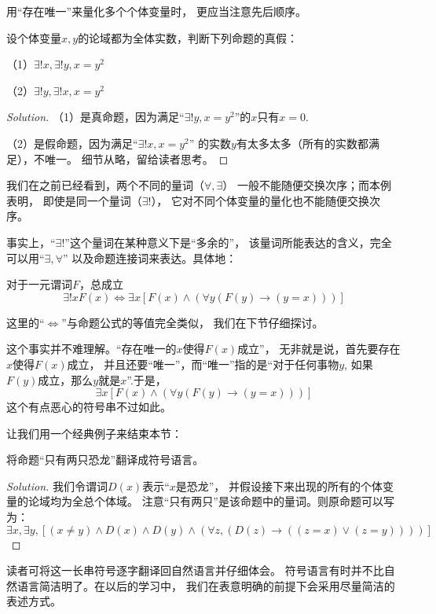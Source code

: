 用“存在唯一”来量化多个个体变量时，
更应当注意先后顺序。

\begin{example}
设个体变量$x,y$的论域都为全体实数，判断下列命题的真假：

（1）$\exists!x,\exists!y,x=y^2$

（2）$\exists!y,\exists!x,x=y^2$
\end{example}

\begin{proof}[Solution]
（1）是真命题，因为满足“$\exists!y,x=y^2$”的$x$只有$x=0$.

（2）是假命题，因为满足“$\exists!x,x=y^2$”
的实数$y$有太多太多（所有的实数都满足），不唯一。
细节从略，留给读者思考。
\end{proof}

我们在之前已经看到，两个不同的量词（$\forall,\exists$）
一般不能随便交换次序；而本例表明，
即使是同一个量词（$\exists!$），
它对不同个体变量的量化也不能随便交换次序。
\vs

事实上，“$\exists!$”这个量词在某种意义下是“多余的”，
该量词所能表达的含义，完全可以用“$\exists,\forall$”
以及命题连接词来表达。具体地：

\begin{thm}对于一元谓词$F$，总成立
$$\exists!xF(x)\Leftrightarrow
\exists x[F(x)\wedge(\forall y(F(y)\rightarrow(y=x)))]$$
\end{thm}
这里的“$\Leftrightarrow$”与命题公式的等值完全类似，
我们在下节仔细探讨。

这个事实并不难理解。“存在唯一的$x$使得$F(x)$成立”，
无非就是说，首先要存在$x$使得$F(x)$成立，
并且还要“唯一”，而“唯一”指的是“对于任何事物$y$,
如果$F(y)$成立，那么$y$就是$x$”.于是，
$$\exists x[F(x)\wedge(\forall y(F(y)\rightarrow(y=x)))]$$
这个有点恶心的符号串不过如此。\vs

让我们用一个经典例子来结束本节：

\begin{example}
将命题“只有两只恐龙”翻译成符号语言。
\end{example}

\begin{proof}[Solution]
我们令谓词$D(x)$表示“$x$是恐龙”，
并假设接下来出现的所有的个体变量的论域均为全总个体域。
注意“只有两只”是该命题中的量词。则原命题可以写为：
$$\exists x,\exists y,
[(x\neq y)\wedge D(x)\wedge D(y)\wedge
(\forall z,(D(z)\rightarrow((z=x)\vee(z=y))))]$$
\end{proof}

读者可将这一长串符号逐字翻译回自然语言并仔细体会。
符号语言有时并不比自然语言简洁明了。在以后的学习中，
我们在表意明确的前提下会采用尽量简洁的表述方式。

